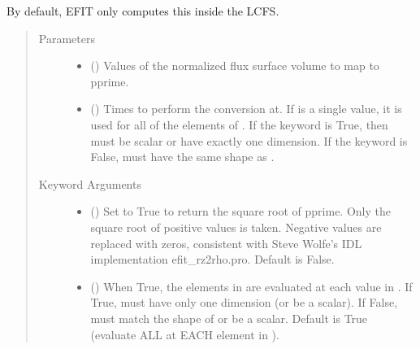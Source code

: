 \documentclass[letterpaper,10pt,english]{sphinxmanual}
\begin{document}
\begin{fulllineitems}
\begin{fulllineitems}
By default, EFIT only computes this inside the LCFS.
\begin{quote}\begin{description}
\item[{Parameters}] \leavevmode\begin{itemize}
\item {} 
 () \textendash{} Values of the normalized
flux surface volume to map to pprime.

\item {} 
 () \textendash{} Times to perform the conversion at.
If  is a single value, it is used for all of the elements of
. If the  keyword is True, then  must be scalar
or have exactly one dimension. If the  keyword is False,
 must have the same shape as .

\end{itemize}

\item[{Keyword Arguments}] \leavevmode\begin{itemize}
\item {} 
 () \textendash{} Set to True to return the square root of pprime.
Only the square root of positive values is taken. Negative
values are replaced with zeros, consistent with Steve Wolfe’s
IDL implementation efit\_rz2rho.pro. Default is False.

\item {} 
 () \textendash{} When True, the elements in  are evaluated
at each value in . If True,  must have only one dimension
(or be a scalar). If False,  must match the shape of 
or be a scalar. Default is True (evaluate ALL  at EACH
element in ).


\end{itemize}
\end{description}
\end{quote}
\end{fulllineitems}
\end{fulllineitems}
\end{document}
